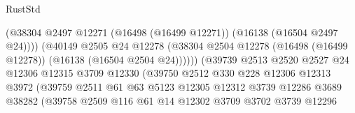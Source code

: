 \begin{lexlean}{RustStd}
\begin{coremodule}
                                            (@38304
                                              @2497
                                              @12271
                                              (@16498 (@16499 @12271))
                                              (@16138 (@16504 @2497 @24))))
                                          (@40149
                                            @2505
                                            @24
                                            @12278
                                            (@38304
                                              @2504
                                              @12278
                                              (@16498 (@16499 @12278))
                                              (@16138 (@16504 @2504 @24))))))
                                      (@39739
                                        @2513
                                        @2520
                                        @2527
                                        @24
                                        @12306
                                        @12315
                                        @3709
                                        @12330
                                        (@39750
                                          @2512
                                          @330
                                          @228
                                          @12306
                                          @12313
                                          @3972
                                          (@39759
                                            @2511
                                            @61
                                            @63
                                            @5123
                                            @12305
                                            @12312
                                            @3739
                                            @12286
                                            @3689
                                            @38282
                                            (@39758
                                              @2509
                                              @116
                                              @61
                                              @14
                                              @12302
                                              @3709
                                              @3702
                                              @3739
                                              @12296

\end{coremodule}
\end{lexlean}

